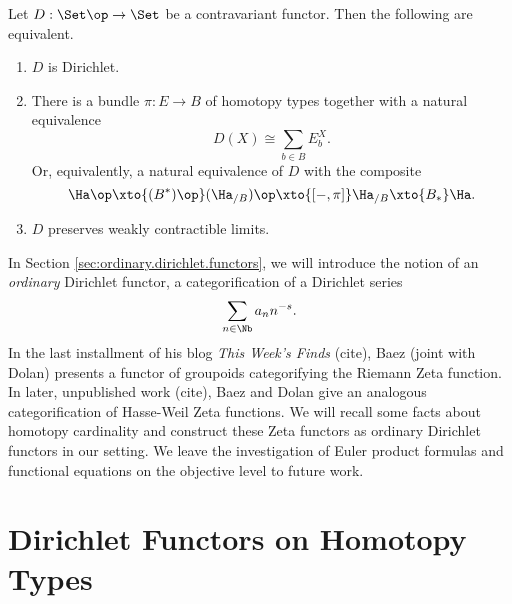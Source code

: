 \begin{thm}\label{thm:dirichlet.type.characterization}
Let $D : \Set\op \to \Set$  be a contravariant functor. Then the following are
equivalent.
\begin{enumerate}
\item $D$ is Dirichlet. 
\item There is a bundle $\pi : E \to B$ of homotopy types together with a natural equivalence
  $$D(X) \cong \sum_{b \in B} E_b^X.$$
  Or, equivalently, a natural equivalence of $D$ with the composite
  $$\Ha\op \xto{(B^{\ast})\op} (\Ha_{/B})\op \xto{[-, \pi]} \Ha_{/B}
  \xto{B_{\ast}} \Ha.$$
\item $D$ preserves weakly contractible limits.
\end{enumerate}
\end{thm}

In Section \ref{sec:ordinary.dirichlet.functors}, we will introduce the notion
of an \emph{ordinary} Dirichlet functor, a categorification of a Dirichlet
series
$$\sum_{n \in \Nb} a_n n^{-s}.$$
In the last installment of his blog \emph{This Week's Finds} (cite), Baez (joint with
Dolan) presents a functor of groupoids categorifying the Riemann Zeta function.
In later, unpublished work (cite), Baez and Dolan give an analogous
categorification of Hasse-Weil Zeta functions. We will recall some facts about
homotopy cardinality and construct these Zeta functors as ordinary Dirichlet
functors in our setting. We leave the investigation of Euler product formulas
and functional equations on the objective level to future work.

\begin{acknowledgements}

\end{acknowledgements}

\section{Dirichlet Functors on Homotopy Types} \label{sec:type.level}

